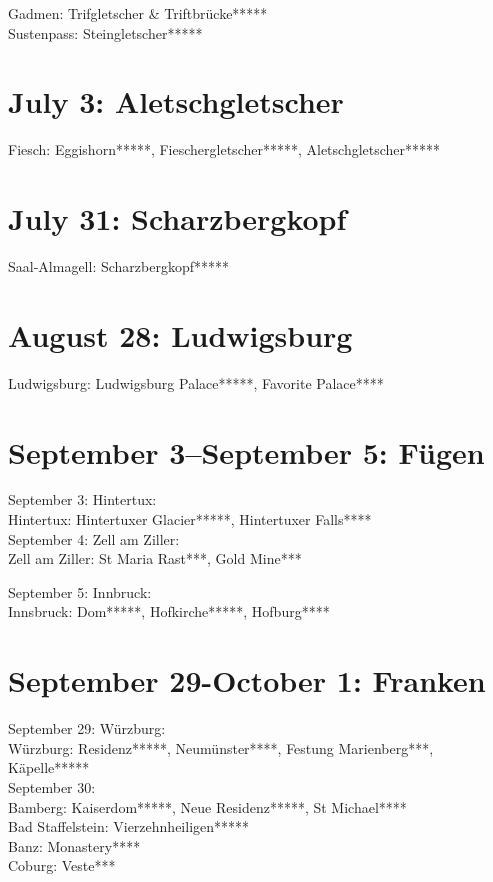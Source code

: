 Gadmen: Trifgletscher \& Triftbr\"ucke*****\\
Sustenpass: Steingletscher*****

\section{July 3: Aletschgletscher}
\label{Aletsch2011}

Fiesch: Eggishorn*****, Fieschergletscher*****, Aletschgletscher*****

\section{July 31: Scharzbergkopf}
\label{Saasalmagell2011}

Saal-Almagell: Scharzbergkopf*****

\section{August 28: Ludwigsburg}
\label{Ludwigsburg2011}

Ludwigsburg: Ludwigsburg Palace*****, Favorite Palace****

\section{September 3--September 5: F\"ugen}
\label{Tirol2011}

September 3: Hintertux:\\
Hintertux: Hintertuxer Glacier*****, Hintertuxer Falls****\\

September 4: Zell am Ziller:\\
Zell am Ziller: St Maria Rast***, Gold Mine***

September 5: Innbruck:\\
Innsbruck: Dom*****, Hofkirche*****, Hofburg****

\section{September 29-October 1: Franken}
\label{Franken2011}

September 29: W\"urzburg:\\
W\"urzburg: Residenz*****, Neum\"unster****, Festung Marienberg***, K\"apelle*****\\

September 30:\\
Bamberg: Kaiserdom*****, Neue Residenz*****, St Michael****\\
Bad Staffelstein: Vierzehnheiligen*****\\
Banz: Monastery****\\
Coburg: Veste***\\

